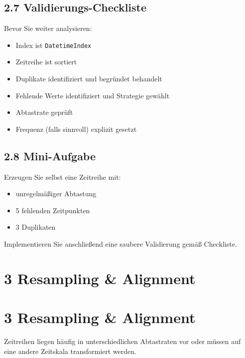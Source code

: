 \documentclass[
  ngerman,
  letterpaper,
  DIV=11]{scrreprt}
\providecommand{\tightlist}{%
  \setlength{\itemsep}{0pt}\setlength{\parskip}{0pt}}
\begin{document}
\section{2.7 Validierungs-Checkliste}\label{validierungs-checkliste}

Bevor Sie weiter analysieren:

\begin{itemize}
\tightlist
\item[$\square$]
  Index ist \texttt{DatetimeIndex}
\item[$\square$]
  Zeitreihe ist sortiert
\item[$\square$]
  Duplikate identifiziert und begründet behandelt
\item[$\square$]
  Fehlende Werte identifiziert und Strategie gewählt
\item[$\square$]
  Abtastrate geprüft
\item[$\square$]
  Frequenz (falls sinnvoll) explizit gesetzt
\end{itemize}

\section{2.8 Mini-Aufgabe}\label{mini-aufgabe}

Erzeugen Sie selbst eine Zeitreihe mit:

\begin{itemize}
\tightlist
\item
  unregelmäßiger Abtastung
\item
  5 fehlenden Zeitpunkten
\item
  3 Duplikaten
\end{itemize}

Implementieren Sie anschließend eine saubere Validierung gemäß
Checkliste.


\chapter{3 Resampling \& Alignment}\label{resampling-alignment}


\chapter{3 Resampling \& Alignment}\label{resampling-alignment-1}

Zeitreihen liegen häufig in unterschiedlichen Abtastraten vor oder
müssen auf eine andere Zeitskala transformiert werden.
\end{document}
